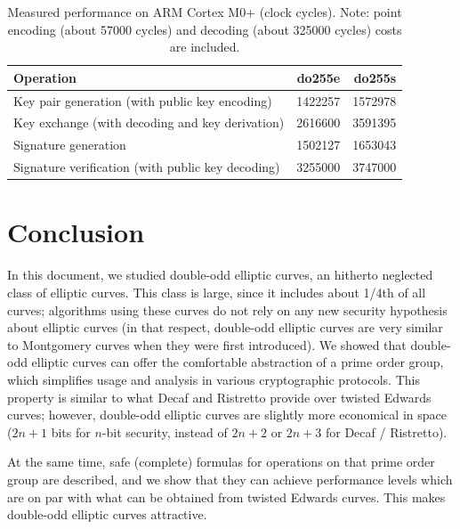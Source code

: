 \documentclass{llncs}
\begin{document}
\begin{table}[H]
    \begin{center}
\begin{tabular}{|l|r|r|}
\hline
\textsf{\textbf{Operation}} &
\textsf{\textbf{do255e}} &
\textsf{\textbf{do255s}} \\
\hline
Key pair generation (with public key encoding)     &  1422257 &  1572978 \\
Key exchange (with decoding and key derivation)    &  2616600 &  3591395 \\
Signature generation                               &  1502127 &  1653043 \\
Signature verification (with public key decoding)  &  3255000 &  3747000 \\
\hline
\end{tabular}
    \end{center}
    \caption{\label{tab:implementations:perfcm0}Measured performance on
    ARM Cortex M0+ (clock cycles). Note: point encoding (about 57000
    cycles) and decoding (about 325000 cycles) costs are included.}
\end{table}

\section{Conclusion}

In this document, we studied double-odd elliptic curves, an hitherto
neglected class of elliptic curves. This class is large, since it
includes about 1/4th of all curves; algorithms using these curves do not
rely on any new security hypothesis about elliptic curves (in that
respect, double-odd elliptic curves are very similar to Montgomery
curves when they were first introduced). We showed that double-odd
elliptic curves can offer the comfortable abstraction of a prime order
group, which simplifies usage and analysis in various cryptographic
protocols. This property is similar to what Decaf and Ristretto provide
over twisted Edwards curves; however, double-odd elliptic curves are
slightly more economical in space ($2n+1$ bits for $n$-bit security,
instead of $2n+2$ or $2n+3$ for Decaf / Ristretto).

At the same time, safe (complete) formulas for operations on that prime
order group are described, and we show that they can achieve performance
levels which are on par with what can be obtained from twisted Edwards
curves. This makes double-odd elliptic curves attractive.
\end{document}

